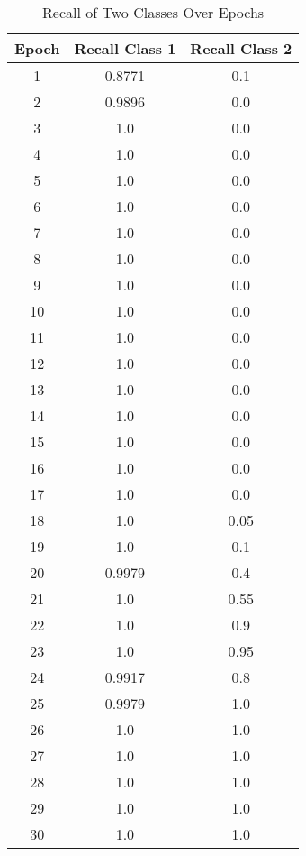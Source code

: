 \begin{table}[H]
\centering
\begin{tabular}{c|c|c}
\hline
Epoch & Recall Class 1 & Recall Class 2 \\
\hline
1 & 0.8771 & 0.1 \\
2 & 0.9896 & 0.0 \\
3 & 1.0 & 0.0 \\
4 & 1.0 & 0.0 \\
5 & 1.0 & 0.0 \\
6 & 1.0 & 0.0 \\
7 & 1.0 & 0.0 \\
8 & 1.0 & 0.0 \\
9 & 1.0 & 0.0 \\
10 & 1.0 & 0.0 \\
11 & 1.0 & 0.0 \\
12 & 1.0 & 0.0 \\
13 & 1.0 & 0.0 \\
14 & 1.0 & 0.0 \\
15 & 1.0 & 0.0 \\
16 & 1.0 & 0.0 \\
17 & 1.0 & 0.0 \\
18 & 1.0 & 0.05 \\
19 & 1.0 & 0.1 \\
20 & 0.9979 & 0.4 \\
21 & 1.0 & 0.55 \\
22 & 1.0 & 0.9 \\
23 & 1.0 & 0.95 \\
24 & 0.9917 & 0.8 \\
25 & 0.9979 & 1.0 \\
26 & 1.0 & 1.0 \\
27 & 1.0 & 1.0 \\
28 & 1.0 & 1.0 \\
29 & 1.0 & 1.0 \\
30 & 1.0 & 1.0 \\
\hline
\end{tabular}
\caption{Recall of Two Classes Over Epochs}
\end{table}
